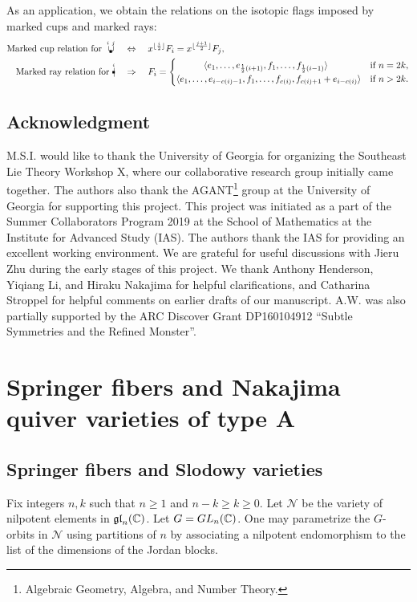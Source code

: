 \documentclass[11pt,reqno]{amsart}
\numberwithin{equation}{section}
\theoremstyle{definition}
\newcommand{\tif}{\textup{if }}
\newcommand{\mcup}[2]{
\overset{
\hspace{.7mm}
{}_{#1}
\hspace{.9mm}
{}_{#2}}{
\cup\raisebox{-.5mm}{\hspace{-1.85mm}\scaleobj{.4}{\blacksquare}}
	} 
}
\newcommand{\mray}[1]{
\overset{{}_{#1}}{|\raisebox{.4mm}{\hspace{-1.2mm}\scaleobj{0.4}{\blacksquare}}} 
}
\begin{document}
As an application, we obtain the relations on the isotopic flags imposed by marked cups and marked rays:
\[
\begin{split}
\textup{Marked cup relation for } 
\mcup{i}{j}
&
\quad
\Leftrightarrow 
\quad
x^{\lfloor\frac{i}{2}\rfloor}F_i = x^{\lfloor\frac{j+1}{2}\rfloor}F_j,
\\
\textup{Marked ray relation for } 
\mray{i}
&
\quad
\Rightarrow 
\quad 
F_i=
\begin{cases}
\qquad \quad \langle e_1,\ldots,e_{\frac{1}{2}(i+1)},f_1,\ldots,f_{\frac{1}{2}(i-1)}\rangle
&\tif n=2k, 
\\
\langle e_1,\ldots,e_{i-c(i)-1},f_1,\ldots,f_{c(i)}, {f_{c(i)+1}+e_{i-c(i)}}\rangle
&\tif n > 2k.
\end{cases}
\end{split}
\]


\subsection*{Acknowledgment}
M.S.I. would like to thank the University of Georgia for organizing the Southeast Lie Theory Workshop X, where our collaborative research group initially came together. 
The authors also thank the AGANT\footnote{Algebraic Geometry, Algebra, and Number Theory.} group at the University of Georgia for supporting this project. 
This project was initiated as a part of the Summer Collaborators Program 2019 at the School of Mathematics at the Institute for Advanced Study (IAS). The authors thank the IAS for providing an excellent working environment.
We are grateful for useful discussions with Jieru Zhu during the early stages of this project. 
We thank Anthony Henderson, Yiqiang Li, and Hiraku Nakajima for helpful clarifications, and Catharina Stroppel for helpful comments on earlier drafts of our manuscript. 
A.W. was also partially supported by the ARC Discover Grant DP160104912 ``Subtle Symmetries and the Refined Monster''.

\section{Springer fibers and Nakajima quiver varieties of type A}
\subsection{Springer fibers and Slodowy varieties} 
Fix integers $n, k$ such that $n \geq 1$ and $n-k \geq k \geq 0$.
Let $\mathcal{N}$ be the variety of nilpotent elements in $\mathfrak{gl}_n(\mathbb{C})$. Let $G=GL_n(\mathbb{C})$. 
One may parametrize the $G$-orbits in $\mathcal{N}$ using partitions of $n$ by associating a nilpotent endomorphism to the list of the dimensions of the Jordan blocks. 
\end{document}
